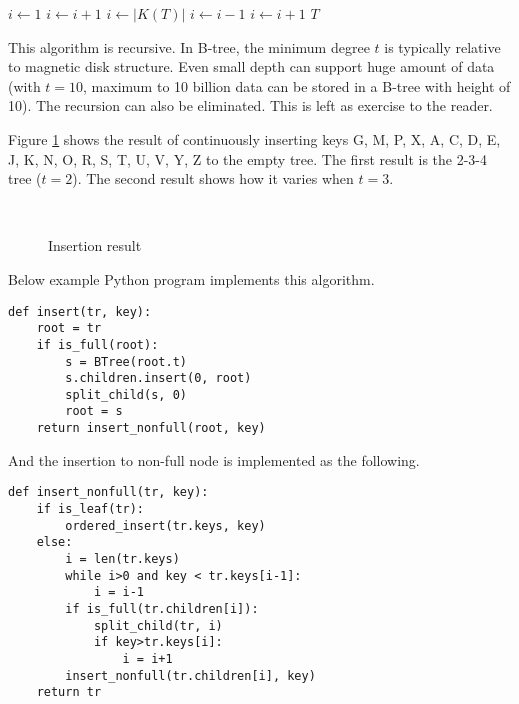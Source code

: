 \documentclass[UTF8]{article}
\begin{document}
\begin{algorithmic}[1]
    \State $i \gets 1$
      \State $i \gets i+1$
    \EndWhile
    \State {}
  \Else
    \State $i \gets |K(T)|$
      \State $i \gets i-1$
    \EndWhile
      \State {}
        \State $i \gets i+1$
      \EndIf
    \EndIf
    \State {}
  \EndIf
  \State \Return $T$
\EndFunction
\end{algorithmic}

This algorithm is recursive. In B-tree,
the minimum degree $t$ is typically relative to magnetic disk structure.
Even small depth can support huge amount of data
(with $t=10$, maximum to 10 billion data can be stored in a B-tree with height of 10).
The recursion can also be eliminated. This is left as exercise to the reader.

Figure \ref{fig:btree-insert} shows the result of continuously inserting
keys G, M, P, X, A, C, D, E, J, K, N, O, R, S, T, U, V, Y, Z to the empty tree.
The first result is the 2-3-4 tree ($t=2$). The second result shows how
it varies when $t=3$.

\begin{figure}[htbp]
  \centering
  \\
  \caption{Insertion result} \label{fig:btree-insert}
\end{figure}

Below example Python program implements this algorithm.
\lstset{language=Python}
\begin{lstlisting}
def insert(tr, key):
    root = tr
    if is_full(root):
        s = BTree(root.t)
        s.children.insert(0, root)
        split_child(s, 0)
        root = s
    return insert_nonfull(root, key)
\end{lstlisting}

And the insertion to non-full node is implemented as the following.

\begin{lstlisting}
def insert_nonfull(tr, key):
    if is_leaf(tr):
        ordered_insert(tr.keys, key)
    else:
        i = len(tr.keys)
        while i>0 and key < tr.keys[i-1]:
            i = i-1
        if is_full(tr.children[i]):
            split_child(tr, i)
            if key>tr.keys[i]:
                i = i+1
        insert_nonfull(tr.children[i], key)
    return tr
\end{lstlisting}
\end{document}
